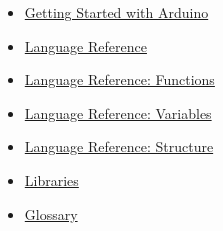 \begin{frame}
    \begin{itemize}
        \item \href{https://docs.arduino.cc/learn/starting-guide/getting-started-arduino}{Getting Started with Arduino}
        \item \href{https://www.arduino.cc/reference/en/}{Language Reference}
        \item \href{https://www.arduino.cc/reference/en/\#functions}{Language Reference: Functions}
        \item \href{https://www.arduino.cc/reference/en/\#variables}{Language Reference: Variables}
        \item \href{https://www.arduino.cc/reference/en/\#structure}{Language Reference: Structure}
        \item \href{https://www.arduino.cc/reference/en/libraries/}{Libraries}
        \item \href{https://www.arduino.cc/glossary/en/}{Glossary}
    \end{itemize}
\end{frame}